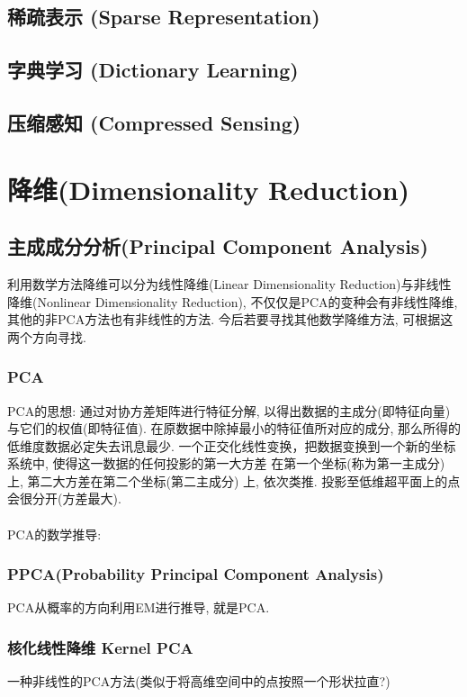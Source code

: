 \documentclass[oneside]{book}
\begin{document}
				\subsection{稀疏表示 (Sparse Representation)}

				\subsection{字典学习 (Dictionary Learning)}

				\subsection{压缩感知 (Compressed Sensing)}

		\section{降维(Dimensionality Reduction)}
				\subsection{主成成分分析(Principal Component Analysis)}
					利用数学方法降维可以分为线性降维(Linear Dimensionality Reduction)与非线性降维(Nonlinear Dimensionality Reduction), 不仅仅是PCA的变种会有非线性降维, 其他的非PCA方法也有非线性的方法. 今后若要寻找其他数学降维方法, 可根据这两个方向寻找.
					\subsubsection{PCA \NovaMonoFont{[Linear]}}
					PCA的思想: 通过对协方差矩阵进行特征分解, 以得出数据的主成分(即特征向量) 与它们的权值(即特征值).
					在原数据中除掉最小的特征值所对应的成分, 那么所得的低维度数据必定失去讯息最少.
					一个正交化线性变换，把数据变换到一个新的坐标系统中, 使得这一数据的任何投影的第一大方差
					在第一个坐标(称为第一主成分) 上, 第二大方差在第二个坐标(第二主成分) 上, 依次类推.
					投影至低维超平面上的点会很分开(方差最大).\\ \\
					PCA的数学推导:\\
					\subsubsection{PPCA(Probability Principal Component Analysis) \NovaMonoFont{[Linear]}}
					PCA从概率的方向利用EM进行推导, 就是PCA. 
					\subsubsection{核化线性降维 Kernel PCA \NovaMonoFont{[Nonlinear]}}
					一种非线性的PCA方法(类似于将高维空间中的点按照一个形状拉直?)
\end{document}
